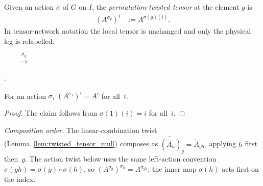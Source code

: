 \begin{definition}\label{def:perm_twisted_tensor}
    \leanok
    Given an action $\sigma$ of $G$ on $I$, the
    \emph{permutation-twisted tensor} at the element $g$ is
    \begin{align}
        (A^{\sigma_g})^i & := A^{\sigma(g)(i)}.
        \label{eq:symmetry_perm_twist}
    \end{align}
    In tensor-network notation the local tensor is unchanged and only the
    physical leg is relabelled:
    \begin{tenkzequation}
        \tenkzkernel
        \begin{tenkz}[cols=1, boundary=open]
        \end{tenkz}
        \(\qquad \xrightarrow{\sigma_g} \qquad\)
        \begin{tenkz}[cols=1, boundary=open]
        \end{tenkz}.
    \end{tenkzequation}
\end{definition}

\begin{lemma}\label{lem:perm_twisted_one}
    \leanok
    For an action $\sigma$, $(A^{\sigma_1})^i = A^i$ for all~$i$.
\end{lemma}

\begin{proof}\leanok{}
    The claim follows from $\sigma(1)(i) = i$ for all~$i$.
\end{proof}

\noindent\emph{Composition order.}
The linear-combination twist (Lemma~\ref{lem:twisted_tensor_mul}) composes as
$\widetilde{(\widetilde{A}_h)}_g = \widetilde{A}_{gh}$, applying $h$ first
then~$g$. The action twist below uses the same left-action convention
$\sigma(gh) = \sigma(g) \circ \sigma(h)$, so
$(A^{\sigma_g})^{\sigma_h} = A^{\sigma_{gh}}$; the inner map
$\sigma(h)$ acts first on the index.

